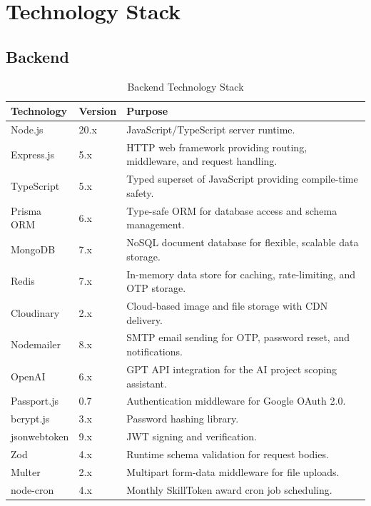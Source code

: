 \section{Technology Stack}

\subsection{Backend}

\begin{table}[H]
\centering
\caption{Backend Technology Stack}
\begin{tabularx}{\textwidth}{llX}
\toprule
\textbf{Technology} & \textbf{Version} & \textbf{Purpose} \\
\midrule
Node.js    & 20.x  & JavaScript/TypeScript server runtime. \\
Express.js & 5.x   & HTTP web framework providing routing, middleware, and request handling. \\
TypeScript & 5.x   & Typed superset of JavaScript providing compile-time safety. \\
Prisma ORM & 6.x   & Type-safe ORM for database access and schema management. \\
MongoDB    & 7.x   & NoSQL document database for flexible, scalable data storage. \\
Redis      & 7.x   & In-memory data store for caching, rate-limiting, and OTP storage. \\
Cloudinary & 2.x   & Cloud-based image and file storage with CDN delivery. \\
Nodemailer & 8.x   & SMTP email sending for OTP, password reset, and notifications. \\
OpenAI     & 6.x   & GPT API integration for the AI project scoping assistant. \\
Passport.js & 0.7  & Authentication middleware for Google OAuth 2.0. \\
bcrypt.js  & 3.x   & Password hashing library. \\
jsonwebtoken & 9.x & JWT signing and verification. \\
Zod        & 4.x   & Runtime schema validation for request bodies. \\
Multer     & 2.x   & Multipart form-data middleware for file uploads. \\
node-cron  & 4.x   & Monthly SkillToken award cron job scheduling. \\
\bottomrule
\end{tabularx}
\label{tab:backend_stack}
\end{table}

